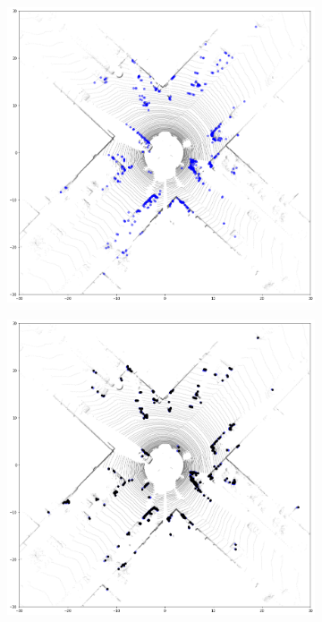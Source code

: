 \documentclass[sigconf]{acmart}
\begin{document}
\begin{figure}[t!]
\setlength{\belowcaptionskip}{-0.1cm} 
     \centering
     \begin{subfigure}[t]{0.3\textwidth}
         \centering
         \includegraphics[width=\textwidth]{Figures/matching1.png}
         \caption{}
         \label{fig:matching a}
     \end{subfigure}
     \begin{subfigure}[t]{0.3\textwidth}
         \centering
         \includegraphics[width=\textwidth]{Figures/matching2.png}
         \caption{}
         \label{fig:matching b}
     \end{subfigure}
     

\end{figure}
\end{document}

